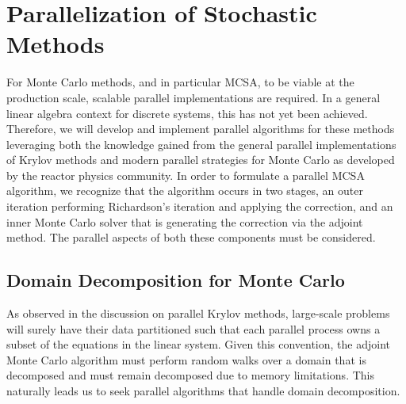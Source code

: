 \section{Parallelization of Stochastic Methods}
\label{sec:parallel_stochastic_methods}
For Monte Carlo methods, and in particular MCSA, to be viable at the
production scale, scalable parallel implementations are required. In a
general linear algebra context for discrete systems, this has not yet
been achieved. Therefore, we will develop and implement parallel
algorithms for these methods leveraging both the knowledge gained from
the general parallel implementations of Krylov methods and modern
parallel strategies for Monte Carlo as developed by the reactor
physics community. In order to formulate a parallel MCSA algorithm, we
recognize that the algorithm occurs in two stages, an outer iteration
performing Richardson's iteration and applying the correction, and an
inner Monte Carlo solver that is generating the correction via the
adjoint method. The parallel aspects of both these components must be
considered.

\subsection{Domain Decomposition for Monte Carlo}
\label{subsec:msod}
As observed in the discussion on parallel Krylov methods, large-scale
problems will surely have their data partitioned such that each
parallel process owns a subset of the equations in the linear
system. Given this convention, the adjoint Monte Carlo algorithm must
perform random walks over a domain that is decomposed and must remain
decomposed due to memory limitations. This naturally leads us to seek
parallel algorithms that handle domain decomposition.

